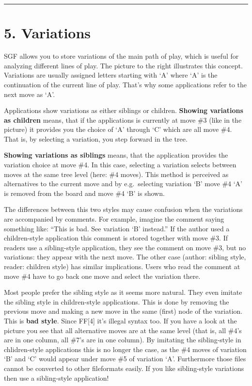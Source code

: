 \begin{center}\rule{0.5\linewidth}{0.5pt}\end{center}

\section{5. Variations}\label{variations-1}

SGF allows you to store variations of the main path of play, which is
useful for analyzing different lines of play. The picture to the right
illustrates this concept. Variations are usually assigned letters
starting with `A' where `A' is the continuation of the current line of
play. That's why some applications refer to the next move as `A'.

Applications show variations as either siblings or children.
\textbf{Showing variations as children} means, that if the applications
is currently at move \#3 (like in the picture) it provides you the
choice of `A' through `C' which are all move \#4. That is, by selecting
a variation, you step forward in the tree.

\textbf{Showing variations as siblings} means, that the application
provides the variation choice at move \#4. In this case, selecting a
variation selects between moves at the same tree level (here: \#4
moves). This method is perceived as alternatives to the current move and
by e.g.~selecting variation `B' move \#4 `A' is removed from the board
and move \#4 `B' is shown.

The differences between this two styles may cause confusion when the
variations are accompanied by comments. For example, imagine the comment
saying something like: ``This is bad. See variation `B' instead.'' If
the author used a children-style application this comment is stored
together with move \#3. If readers use a sibling-style application, they
see the comment on move \#3, but no variations: they appear with the
next move. The other case (author: sibling style, reader: children
style) has similar implications. Users who read the comment at move \#4
have to go back one move and select the variation there.

Most people prefer the sibling style as it seems more natural. They even
imitate the sibling style in children-style applications. This is done
by removing the previous move and making a new move in the same (first)
node of the variation. This is \textbf{bad style}. Since FF{[}4{]} it's
illegal syntax too. If you have a look at the picture you see that all
alternative moves are at the same level (that is, all \#4's are in one
column, all \#7's are in one column). By imitating the sibling-style in
chlidren-style applications this is no longer the case, as the \#4 moves
of variation `B' and `C' would appear under move \#5 of variation `A'.
Furthermore those files cannot be converted to other fileformats easily.
If you like sibling-style variations then use a sibling-style
application!

